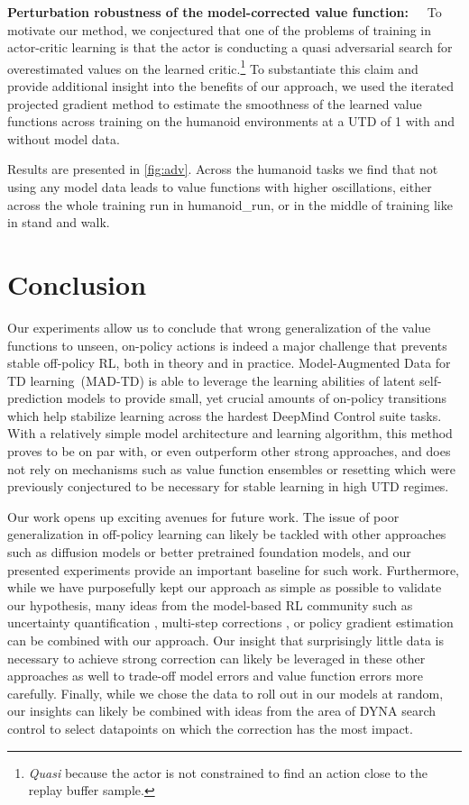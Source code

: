 \textbf{Perturbation robustness of the model-corrected value function:}~~~To motivate our method, we conjectured that one of the problems of training in actor-critic learning is that the actor is conducting a quasi adversarial search for overestimated values on the learned critic.\footnote{\emph{Quasi} because the actor is not constrained to find an action close to the replay buffer sample.}
To substantiate this claim and provide additional insight into the benefits of our approach, we used the iterated projected gradient method \cite{madry2018towards} to estimate the smoothness of the learned value functions across training on the humanoid environments at a UTD of 1 with and without model data.

Results are presented in \autoref{fig:adv}.
Across the humanoid tasks we find that not using any model data leads to value functions with higher oscillations, either across the whole training run in \textsf{\small humanoid\_run}, or in the middle of training like in \textsf{\small stand} and \textsf{\small walk}.

\section{Conclusion}

Our experiments allow us to conclude that wrong generalization of the value functions to unseen, on-policy actions is indeed a major challenge that prevents stable off-policy RL, both in theory and in practice.
Model-Augmented Data for TD learning~(MAD-TD) is able to leverage the learning abilities of latent self-prediction models to provide small, yet crucial amounts of on-policy transitions which help stabilize learning across the hardest DeepMind Control suite tasks.
With a relatively simple model architecture and learning algorithm, this method proves to be on par with, or even outperform other strong approaches, and does not rely on mechanisms such as value function ensembles or resetting which were previously conjectured to be necessary for stable learning in high UTD regimes.

Our work opens up exciting avenues for future work.
The issue of poor generalization in off-policy learning can likely be tackled with other approaches such as diffusion models \parencite{lu2024synthetic} or better pretrained foundation models, and our presented experiments provide an important baseline for such work.
Furthermore, while we have purposefully kept our approach as simple as possible to validate our hypothesis, many ideas from the model-based RL community such as uncertainty quantification \parencite{pets,talvitie2024bounding}, multi-step corrections \parencite{buckman2018sample,Hafner2020Dream}, or policy gradient estimation \parencite{amos2021model} can be combined with our approach.
Our insight that surprisingly little data is necessary to achieve strong correction can likely be leveraged in these other approaches as well to trade-off model errors and value function errors more carefully.
Finally, while we chose the data to roll out in our models at random, our insights can likely be combined with ideas from the area of DYNA search control \parencite{pan2019hill,Pan2020Frequencybased} to select datapoints on which the correction has the most impact.
